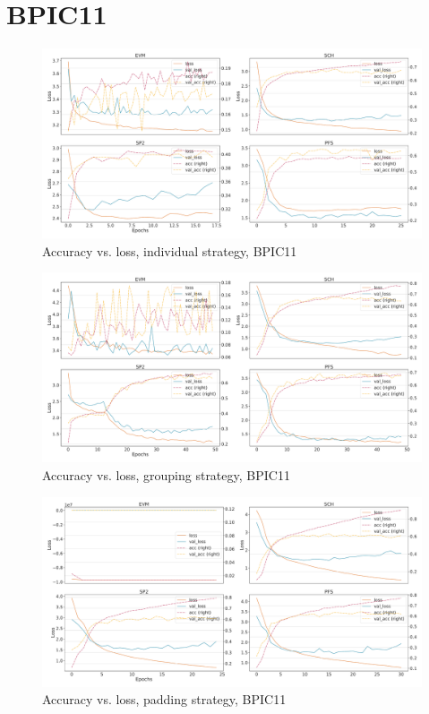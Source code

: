 \section*{BPIC11}
\begin{figure}[!htb]
    \centering
    \includegraphics[width=\textwidth]{gfx/bpic2011/individual_loss_acc_curve.pdf}
    \caption{Accuracy vs. loss, individual strategy, BPIC11}
\end{figure}
\begin{figure}[!htb]
    \centering
    \includegraphics[width=\textwidth]{gfx/bpic2011/grouped_loss_acc_curve.pdf}
    \caption{Accuracy vs. loss, grouping strategy, BPIC11}
\end{figure}
\begin{figure}[!htb]
    \centering
    \includegraphics[width=\textwidth]{gfx/bpic2011/padded_loss_acc_curve.pdf}
    \caption{Accuracy vs. loss, padding strategy, BPIC11}
\end{figure}

